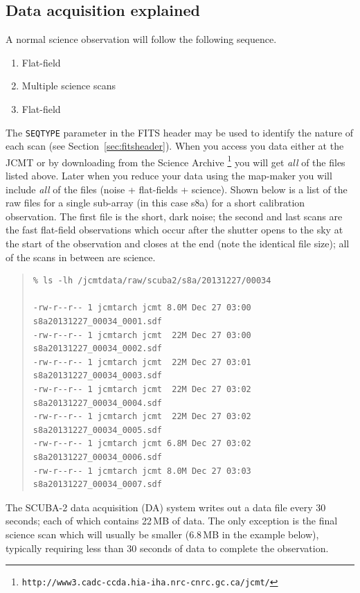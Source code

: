 \documentclass[twoside,11pt]{article}
\newcommand{\htmladdnormallink}[2]{#1}
\newcommand{\htmlref}[2]{#1}
\newenvironment{latexonly}{}{}
\newcommand{\latexhtml}[2]{#1}
\renewcommand{\_}{\texttt{\symbol{95}}}
\newenvironment{myquote}{\begin{quote}\begin{small}}{\end{small}\end{quote}}
\newcommand{\param}[1]{\texttt{#1}}
\newcommand{\cref}[3]{\latexhtml{#1~\ref{#2}}{\htmlref{#3}{#2}}}
\begin{document}
\subsection{Data acquisition explained}
A normal science observation will follow the following sequence.
\vspace{-2mm}
\begin{enumerate}\itemsep-0.2em
\item Flat-field
\item Multiple science scans
\item Flat-field
\end{enumerate}
\vspace{-2mm}
The \param{SEQ\_TYPE} parameter in the FITS header may be used to
identify the nature of each scan (see
\cref{Section}{sec:fitsheader}{Headers and file structure}).
When you access you data either at the JCMT or by downloading from the
\htmladdnormallink{Science Archive}{http://www3.cadc-ccda.hia-iha.nrc-cnrc.gc.ca/jcmt/}
\begin{latexonly}
\footnote{\texttt{http://www3.cadc-ccda.hia-iha.nrc-cnrc.gc.ca/jcmt/}}
\end{latexonly}
you will get \emph{all} of the files listed above. Later when you
reduce your data using the map-maker you will include \emph{all} of
the files (noise + flat-fields + science).
Shown below is a list of the raw files for a single sub-array (in this
case s8a) for a short calibration observation. The first file is the
short, dark noise; the second and last scans are the fast flat-field
observations which occur after the shutter opens to the sky at the
start of the observation and closes at the end (note the identical
file size); all of the scans in between are science.


\begin{myquote}
\begin{verbatim}
% ls -lh /jcmtdata/raw/scuba2/s8a/20131227/00034

-rw-r--r-- 1 jcmtarch jcmt 8.0M Dec 27 03:00 s8a20131227_00034_0001.sdf
-rw-r--r-- 1 jcmtarch jcmt  22M Dec 27 03:00 s8a20131227_00034_0002.sdf
-rw-r--r-- 1 jcmtarch jcmt  22M Dec 27 03:01 s8a20131227_00034_0003.sdf
-rw-r--r-- 1 jcmtarch jcmt  22M Dec 27 03:02 s8a20131227_00034_0004.sdf
-rw-r--r-- 1 jcmtarch jcmt  22M Dec 27 03:02 s8a20131227_00034_0005.sdf
-rw-r--r-- 1 jcmtarch jcmt 6.8M Dec 27 03:02 s8a20131227_00034_0006.sdf
-rw-r--r-- 1 jcmtarch jcmt 8.0M Dec 27 03:03 s8a20131227_00034_0007.sdf
\end{verbatim}
\end{myquote}
The SCUBA-2 data
acquisition (DA) system writes out a data file every 30 seconds; each
of which contains 22\,MB of data. The only exception is the final science
scan which will usually be smaller (6.8\,MB in the example below), typically
requiring less than 30 seconds of data to complete the observation.
\end{document}
